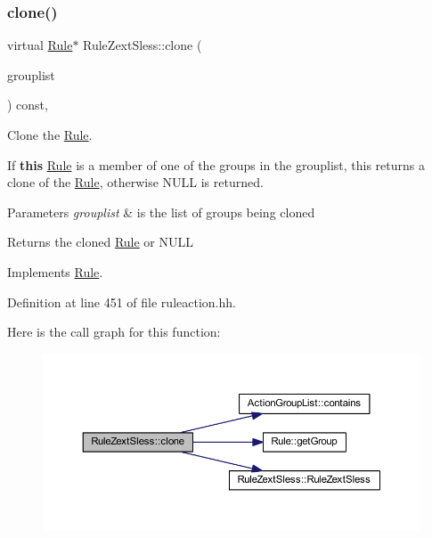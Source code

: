 \subsubsection{\texorpdfstring{clone()}{clone()}}
{\footnotesize\ttfamily virtual \mbox{\hyperlink{class_rule}{Rule}}$\ast$ Rule\+Zext\+Sless\+::clone (\begin{DoxyParamCaption}\item[{const \mbox{\hyperlink{class_action_group_list}{Action\+Group\+List}} \&}]{grouplist }\end{DoxyParamCaption}) const\hspace{0.3cm}{\ttfamily [inline]}, {\ttfamily [virtual]}}



Clone the \mbox{\hyperlink{class_rule}{Rule}}. 

If {\bfseries{this}} \mbox{\hyperlink{class_rule}{Rule}} is a member of one of the groups in the grouplist, this returns a clone of the \mbox{\hyperlink{class_rule}{Rule}}, otherwise N\+U\+LL is returned. 
\begin{DoxyParams}{Parameters}
{\em grouplist} & is the list of groups being cloned \\
\hline
\end{DoxyParams}
\begin{DoxyReturn}{Returns}
the cloned \mbox{\hyperlink{class_rule}{Rule}} or N\+U\+LL 
\end{DoxyReturn}


Implements \mbox{\hyperlink{class_rule_a70de90a76461bfa7ea0b575ce3c11e4d}{Rule}}.



Definition at line 451 of file ruleaction.\+hh.

Here is the call graph for this function\+:
\nopagebreak
\begin{figure}[H]
\begin{center}
\leavevmode
\includegraphics[width=350pt]{class_rule_zext_sless_aa1da647b42694b95d5caa0764a1964db_cgraph}
\end{center}
\end{figure}
\mbox{\label{class_rule_zext_sless_a85d8abc02cf9fa6109872b464e1a1da0}} 
